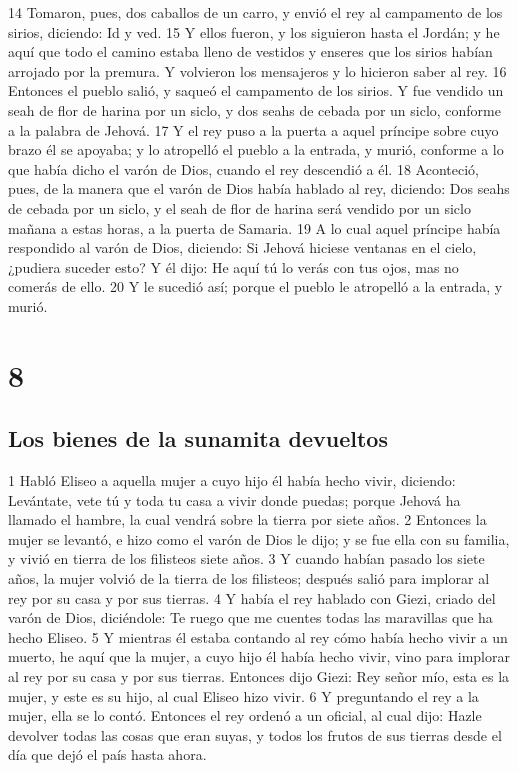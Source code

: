 14 Tomaron, pues, dos caballos de un carro, y envió el rey al campamento de los sirios, diciendo: Id y ved.
15 Y ellos fueron, y los siguieron hasta el Jordán; y he aquí que todo el camino estaba lleno de vestidos y enseres que los sirios habían arrojado por la premura. Y volvieron los mensajeros y lo hicieron saber al rey.
16 Entonces el pueblo salió, y saqueó el campamento de los sirios. Y fue vendido un seah   de flor de harina por un siclo, y dos seahs de cebada por un siclo, conforme a la palabra de Jehová.
17 Y el rey puso a la puerta a aquel príncipe sobre cuyo brazo él se apoyaba; y lo atropelló el pueblo a la entrada, y murió, conforme a lo que había dicho el varón de Dios, cuando el rey descendió a él.
18 Aconteció, pues, de la manera que el varón de Dios había hablado al rey, diciendo: Dos seahs   de cebada por un siclo, y el seah de flor de harina será vendido por un siclo mañana a estas horas, a la puerta de Samaria.
19 A lo cual aquel príncipe había respondido al varón de Dios, diciendo: Si Jehová hiciese ventanas en el cielo, ¿pudiera suceder esto? Y él dijo: He aquí tú lo verás con tus ojos, mas no comerás de ello. 
20 Y le sucedió así; porque el pueblo le atropelló a la entrada, y murió.

\chapter{8}

\section*{Los bienes de la sunamita devueltos}


1 Habló Eliseo a aquella mujer a cuyo hijo él había hecho vivir, diciendo: Levántate, vete tú y toda tu casa a vivir donde puedas; porque Jehová ha llamado el hambre, la cual vendrá sobre la tierra por siete años.
2 Entonces la mujer se levantó, e hizo como el varón de Dios le dijo; y se fue ella con su familia, y vivió en tierra de los filisteos siete años.
3 Y cuando habían pasado los siete años, la mujer volvió de la tierra de los filisteos; después salió para implorar al rey por su casa y por sus tierras.
4 Y había el rey hablado con Giezi, criado del varón de Dios, diciéndole: Te ruego que me cuentes todas las maravillas que ha hecho Eliseo.
5 Y mientras él estaba contando al rey cómo había hecho vivir a un muerto, he aquí que la mujer, a cuyo hijo él había hecho vivir, vino para implorar al rey por su casa y por sus tierras. Entonces dijo Giezi: Rey señor mío, esta es la mujer, y este es su hijo, al cual Eliseo hizo vivir.
6 Y preguntando el rey a la mujer, ella se lo contó. Entonces el rey ordenó a un oficial, al cual dijo: Hazle devolver todas las cosas que eran suyas, y todos los frutos de sus tierras desde el día que dejó el país hasta ahora.
